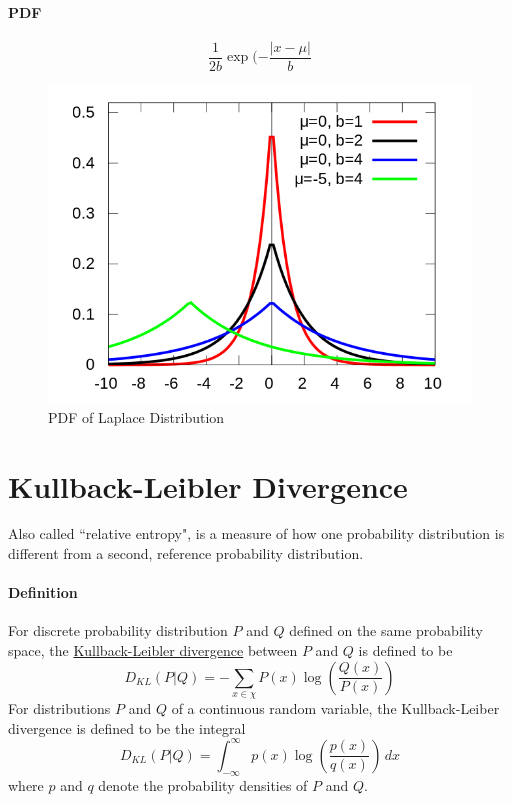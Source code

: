 \documentclass[11pt]{article}
\newcommand{\under}[1]{\underline{#1}}
\begin{document}
\paragraph{PDF}
$$\frac{1}{2b}\exp(-\frac{|x-\mu|}{b}$$
\begin{figure}[h]
	\centering
	\includegraphics[scale=0.3]{laplace.png}
	\caption{PDF of Laplace Distribution}
\end{figure}

\section{Kullback-Leibler Divergence}
Also called ``relative entropy", is a measure of how one probability distribution is different from a second, reference probability distribution.
\paragraph{Definition}
For discrete probability distribution $P$ and $Q$ defined on the same probability space, the \under{Kullback-Leibler divergence} between $P$ and $Q$ is defined to be
$$D_{KL}(P|Q) = - \sum_{x \in \chi} P(x)\log(\frac{Q(x)}{P(x)})$$
For distributions $P$ and $Q$ of a continuous random variable, the Kullback-Leiber divergence is defined to be the integral
$$D_{KL}(P|Q) = \int_{-\infty}^\infty p(x)\log(\frac{p(x)}{q(x)})\, dx$$ where $p$ and $q$ denote the probability densities of $P$ and $Q$.

 
\end{document}
